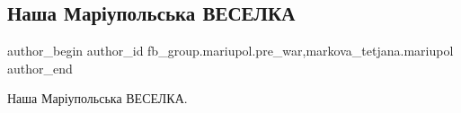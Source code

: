  
 
 
 
 

\subsection{Наша Маріупольська ВЕСЕЛКА}
\label{sec:11_02_2023.fb.fb_group.mariupol.pre_war.6.nasha_mar_upolska_ve}
 
\ifcmt
 author_begin
   author_id fb_group.mariupol.pre_war,markova_tetjana.mariupol
 author_end
\fi

Наша Маріупольська ВЕСЕЛКА.

